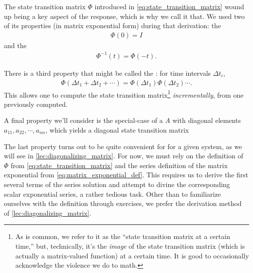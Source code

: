 \documentclass[dynamic_systems.tex]{subfiles}
\begin{document}
The state transition matrix $\Phi$ introduced in \autoref{eq:state_transition_matrix} wound up being a key aspect of the response, which is why we call it that.
We used two of its properties (in matrix exponential form) during that derivation:
the 
\tags{}
\begin{align}
	\Phi(0) = I \tag{where $I$ is the identity matrix}
\end{align}
and the 
\begin{align}
	\Phi^{-1}(t) = \Phi(-t).
\end{align}

There is a third property that might be called the :
for time intervals $\Delta t_i$, 
\begin{align}
	\Phi(\Delta t_1 + \Delta t_2 + \cdots) = \Phi(\Delta t_1) \Phi(\Delta t_2) \cdots.
\end{align}
This allows one to compute the state transition matrix\footnote{As is common, we refer to it as the ``state transition matrix at a certain time,'' but, technically, it's the \emph{image} of the state transition matrix (which is actually a matrix-valued function) at a certain time. It is good to occasionally acknowledge the violence we do to math.} \emph{incrementally}, from one previously computed.
\tags{}

A final property we'll consider is the special-case of a  $A$ with diagonal elements $a_{11}, a_{22}, \cdots, a_{nn}$, which yields a diagonal state transition matrix
\tags{}

The last property turns out to be quite convenient for  for a given system, as we will see in \autoref{lec:diagonalizing_matrix}.
For now, we must rely on the definition of $\Phi$ from \autoref{eq:state_transition_matrix} and the series definition of the matrix exponential from \autoref{eq:matrix_exponential_def}.
This requires us to derive the first several terms of the series solution and attempt to divine the corresponding scalar exponential series, a rather tedious task.
Other than to familiarize ourselves with the definition through exercises, we prefer the derivation method of \autoref{lec:diagonalizing_matrix}.
\tags{}
\end{document}
